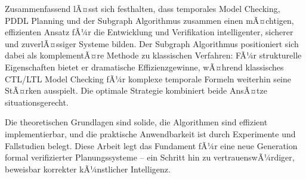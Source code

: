 ﻿\documentclass[a4paper,12pt]{article}
\theoremstyle{definition}
\begin{document}
Zusammenfassend lÃ¤sst sich festhalten, dass temporales Model Checking, PDDL Planning und der Subgraph Algorithmus zusammen einen mÃ¤chtigen, effizienten Ansatz fÃ¼r die Entwicklung und Verifikation intelligenter, sicherer und zuverlÃ¤ssiger Systeme bilden. Der Subgraph Algorithmus positioniert sich dabei als komplementÃ¤re Methode zu klassischen Verfahren: FÃ¼r strukturelle Eigenschaften bietet er dramatische Effizienzgewinne, wÃ¤hrend klassisches CTL/LTL Model Checking fÃ¼r komplexe temporale Formeln weiterhin seine StÃ¤rken ausspielt. Die optimale Strategie kombiniert beide AnsÃ¤tze situationsgerecht.

Die theoretischen Grundlagen sind solide, die Algorithmen sind effizient implementierbar, und die praktische Anwendbarkeit ist durch Experimente und Fallstudien belegt. Diese Arbeit legt das Fundament fÃ¼r eine neue Generation formal verifizierter Planungssysteme -- ein Schritt hin zu vertrauenswÃ¼rdiger, beweisbar korrekter kÃ¼nstlicher Intelligenz.
\end{document}
